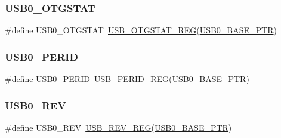 \subsubsection{\texorpdfstring{U\+S\+B0\+\_\+\+O\+T\+G\+S\+T\+AT}{USB0\_OTGSTAT}}
{\footnotesize\ttfamily \#define U\+S\+B0\+\_\+\+O\+T\+G\+S\+T\+AT~\hyperlink{group___u_s_b___register___accessor___macros_gad50d4233733a0ec8cd3f8bd835aeb9fa}{U\+S\+B\+\_\+\+O\+T\+G\+S\+T\+A\+T\+\_\+\+R\+EG}(\hyperlink{group___u_s_b___peripheral_ga598ff5eb20a0551af232710b3f27640a}{U\+S\+B0\+\_\+\+B\+A\+S\+E\+\_\+\+P\+TR})}

\mbox{\label{group___u_s_b___register___accessor___macros_gabee4af6581d4520bd5d8d823d8668889}} 
\subsubsection{\texorpdfstring{U\+S\+B0\+\_\+\+P\+E\+R\+ID}{USB0\_PERID}}
{\footnotesize\ttfamily \#define U\+S\+B0\+\_\+\+P\+E\+R\+ID~\hyperlink{group___u_s_b___register___accessor___macros_ga61c99097ee83a271dafdfb6b04980cc8}{U\+S\+B\+\_\+\+P\+E\+R\+I\+D\+\_\+\+R\+EG}(\hyperlink{group___u_s_b___peripheral_ga598ff5eb20a0551af232710b3f27640a}{U\+S\+B0\+\_\+\+B\+A\+S\+E\+\_\+\+P\+TR})}

\mbox{\label{group___u_s_b___register___accessor___macros_ga15f94e84d4edea37a5105310c316c303}} 
\subsubsection{\texorpdfstring{U\+S\+B0\+\_\+\+R\+EV}{USB0\_REV}}
{\footnotesize\ttfamily \#define U\+S\+B0\+\_\+\+R\+EV~\hyperlink{group___u_s_b___register___accessor___macros_gafdbb3ea723c0bb8a1f5bb42e84fbdfe5}{U\+S\+B\+\_\+\+R\+E\+V\+\_\+\+R\+EG}(\hyperlink{group___u_s_b___peripheral_ga598ff5eb20a0551af232710b3f27640a}{U\+S\+B0\+\_\+\+B\+A\+S\+E\+\_\+\+P\+TR})}

